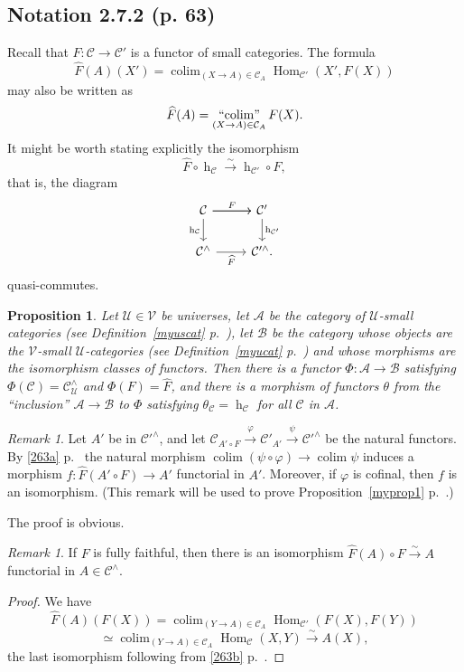 \documentclass[12pt]{article}
\newtheorem{prop}[thm]{Proposition}
\theoremstyle{remark}
\newtheorem{rk}[thm]{Remark}
\theoremstyle{definition}
\newcommand{\cc}{\mathcal}
\newcommand{\A}{\mathcal A}
\newcommand{\B}{\mathcal B}
\newcommand{\C}{\mathcal C}
\newcommand{\U}{\mathcal U}
\newcommand{\V}{\mathcal V}
\newcommand{\pp}{\varphi}
\newcommand{\xr}{\xrightarrow}
\DeclareMathOperator*{\colim}{colim}
\DeclareMathOperator*{\icolim}{``\!\colim\!"}
\DeclareMathOperator{\hy}{h}
\DeclareMathOperator{\Hom}{Hom}
\begin{document}

\subsection{Notation 2.7.2 (p. 63)}

Recall that $F:\C\to\C'$ is a functor of small categories. The formula 
$$
\widehat F(A)(X')=\colim_{(X\to A)\in\C_A}\Hom_{\C'}(X',F(X))
$$
may also be written as 
$$
\widehat F(A)=\icolim_{(X\to A)\in\C_A}F(X).
$$
It might be worth stating explicitly the isomorphism 
$$
\widehat F\circ\hy_\C\xr\sim\hy_{\C'}\circ F, 
$$ 
that is, the diagram 
$$
\begin{tikzcd}
\C\ar{r}\ar{d}[swap]{\hy_\C}\ar{r}{F}&\C'\ar{d}{\hy_{\C'}}\\ 
\C^\wedge\ar{r}[swap]{\widehat F}&\C'^\wedge.
\end{tikzcd}
$$ 
quasi-commutes. 

\begin{prop}\label{yf} 
Let $\U\in\V$ be universes, let $\A$ be the category of $\U$-small categories (see Definition~\ref{myuscat} p.~\pageref{myuscat}), let $\B$ be the category whose objects are the $\V$-small $\U$-categories (see Definition~\ref{myucat} p.~\pageref{myucat}) and whose morphisms are the isomorphism classes of functors. Then there is a functor $\Phi:\A\to\B$ satisfying $\Phi(\C)=\C^\wedge_\U$ and $\Phi(F)=\widehat F$, and there is a morphism of functors $\theta$ from the ``inclusion'' $\A\to\B$ to $\Phi$ satisfying $\theta_\C=\hy_\C$ for all $\C$ in $\A$. 
\end{prop}

\begin{rk}\label{cof}
Let $A'$ be in $\cc C'^\wedge$, and let $\cc C_{A'\circ F}\xr\pp\cc C'_{A'}\xr\psi\C'^\wedge$ be the natural functors. By \eqref{263a} p.~\pageref{263a} the natural morphism $\colim(\psi\circ\pp)\to\colim\psi$ induces a morphism $f:\widehat F(A'\circ F)\to A'$ functorial in $A'$. Moreover, if $\pp$ is cofinal, then $f$ is an isomorphism. (This remark will be used to prove Proposition~\ref{myprop1} p.~\pageref{myprop1}.)
\end{rk}

The proof is obvious.

\begin{rk}
If $F$ is fully faithful, then there is an isomorphism $\widehat F(A)\circ F\xr\sim A$ functorial in $A\in\C^\wedge$.
\end{rk} 

\begin{proof}
We have 
$$
\widehat F(A)(F(X))=\colim_{(Y\to A)\in\C_A}\Hom_{\C'}(F(X),F(Y))
$$
$$
\simeq\colim_{(Y\to A)\in\C_A}\Hom_\C(X,Y)\xr\sim A(X),
$$
the last isomorphism following from \eqref{263b} p.~\pageref{263b}.
\end{proof}
\end{document}
